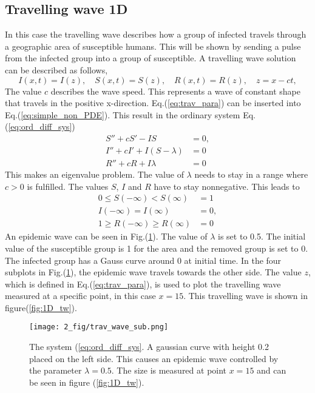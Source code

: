 \documentclass[%
twoside,                 %
final,                   %
chapterprefix=true,      %
open=right               %
10pt]{book}
\begin{document}
\subsection{Travelling wave 1D}
In this case the travelling wave describes how a group of infected travels through a geographic area of susceptible humans. This will be shown by sending a pulse from the infected group into a group of susceptible. A travelling wave solution can be described as follows,
\begin{equation} \label{eq:trav_para}
I(x,t)=I(z),\quad S(x,t)=S(z),\quad R(x,t) = R(z),\quad z = x-ct,
\end{equation}
The value $c$ describes the wave speed. This represents a wave of constant shape that travels in the positive x-direction. Eq.(\ref{eq:trav_para}) can be inserted into Eq.(\ref{eq:simple_non_PDE}). This result in the ordinary system Eq.(\ref{eq:ord_diff_sys})
\begin{equation} \label{eq:ord_diff_sys}
	\begin{aligned}
	S'' + cS' - IS &= 0,\\
	I'' + cI' + I(S-\lambda)&=0\\
	R'' + cR  + I\lambda &=0
	\end{aligned}
\end{equation}
This makes an eigenvalue problem. The value of $\lambda$ needs to stay in a range where $c > 0$ is fulfilled. The values $S$, $I$ and $R$ have to stay nonnegative. This leads to
\begin{equation} 
	\begin{aligned}
	0 \leq S(-\infty) < S(\infty)&=1\\
	I(-\infty)=I(\infty)&=0,\\
	1 \geq R(-\infty)\geq R(\infty) &= 0
	\end{aligned}
\end{equation}
An epidemic wave can be seen in Fig.(\ref{fig:1D_sub}). The value of $\lambda$ is set to 0.5. The initial value of the susceptible group is 1 for the area and the removed group is set to 0. The infected group has a Gauss curve around 0 at initial time. In the four subplots in Fig.(\ref{fig:1D_sub}), the epidemic wave travels towards the other side. The value $z$, which is defined in Eq.(\ref{eq:trav_para}), is used to plot the travelling wave measured at a specific point, in this case $x=15$. This travelling wave is shown in figure(\ref{fig:1D_tw}).       


\begin{figure}[ht]
  \centerline{\texttt{[image: 2\_fig/trav\_wave\_sub.png]}}
  \caption{
  \label{fig:1D_sub} The system (\ref{eq:ord_diff_sys}. A gaussian curve with height 0.2 placed on the left side. This causes an epidemic wave controlled by the parameter $\lambda=0.5$. The size is measured at point $x=15$ and can be seen in figure (\ref{fig:1D_tw}).
  }
\end{figure}
\end{document}
